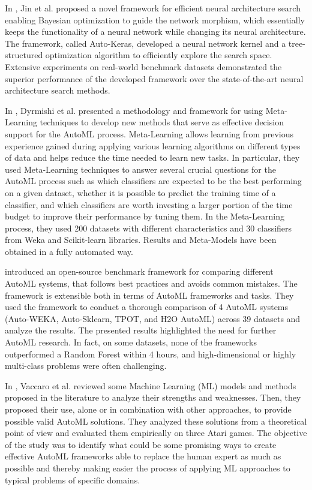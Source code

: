 In \cite{Jin2019}, Jin et al. proposed a novel framework for efficient neural architecture search enabling Bayesian optimization to guide the network morphism, which essentially keeps the functionality of a neural network while changing its neural architecture.
The framework, called Auto-Keras, developed a neural network kernel and a tree-structured optimization algorithm to efficiently explore the search space.
Extensive experiments on real-world benchmark datasets demonstrated the superior performance of the developed framework over the state-of-the-art neural architecture search methods.

In \cite{8955514}, Dyrmishi et al. presented a methodology and framework for using Meta-Learning techniques to develop new methods that serve as effective decision support for the AutoML process.
Meta-Learning allows learning from previous experience gained during applying various learning algorithms on different types of data and helps reduce the time needed to learn new tasks.
In particular, they used Meta-Learning techniques to answer several crucial questions for the AutoML process such as which classifiers are expected to be the best performing on a given dataset, whether it is possible to predict the training time of a classifier, and which classifiers are worth investing a larger portion of the time budget to improve their performance by tuning them.
In the Meta-Learning process, they used 200 datasets with different characteristics and 30 classifiers from Weka and Scikit-learn libraries.
Results and Meta-Models have been obtained in a fully automated way.

\cite{Gijsbers2019} introduced an open-source benchmark framework for comparing different AutoML systems, that follows best practices and avoids common mistakes.
The framework is extensible both in terms of AutoML frameworks and tasks.
They used the framework to conduct a thorough comparison of 4 AutoML systems (Auto-WEKA, Auto-Sklearn, TPOT, and H2O AutoML) across 39 datasets and analyze the results.
The presented results highlighted the need for further AutoML research.
In fact, on some datasets, none of the frameworks outperformed a Random Forest within 4 hours, and high-dimensional or highly multi-class problems were often challenging.

In \cite{computers10010011}, Vaccaro et al. reviewed some Machine Learning (ML) models and methods proposed in the literature to analyze their strengths and weaknesses.
Then, they proposed their use, alone or in combination with other approaches, to provide possible valid AutoML solutions.
They analyzed these solutions from a theoretical point of view and evaluated them empirically on three Atari games.
The objective of the study was to identify what could be some promising ways to create effective AutoML frameworks able to replace the human expert as much as possible and thereby making easier the process of applying ML approaches to typical problems of specific domains.

